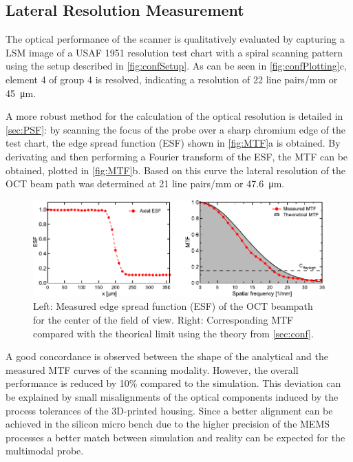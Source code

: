 \subsection{Lateral Resolution Measurement}
The optical performance of the scanner is qualitatively evaluated by capturing a LSM image of a USAF 1951 resolution test chart with a spiral scanning pattern using the setup described in \autoref{fig:confSetup}. As can be seen in \autoref{fig:confPlotting}c, element 4 of group 4 is resolved, indicating a resolution of 22 line pairs/mm or \SI{45}{\micro\meter}. 

A more robust method for the calculation of the optical resolution is detailed in \autoref{sec:PSF}: by scanning the focus of the probe over a sharp chromium edge of the test chart, the edge spread function (ESF) shown in \autoref{fig:MTF}a is obtained. By derivating and then performing a Fourier transform of the ESF, the MTF can be obtained, plotted in \autoref{fig:MTF}b. Based on this curve the lateral resolution of the OCT beam path was determined at 21 line pairs/mm or \SI{47.6}{\micro\meter}. 
\begin{figure}[h!]\centering \includegraphics{figures/50_Measurements/conf/res/confResMeas.pdf}
      \caption{Left: Measured edge spread function (ESF) of the OCT beampath for the center of the field of view. 
      Right: Corresponding MTF compared with the theorical limit using the theory from \autoref{sec:conf}.}
      \label{fig:MTF}
\end{figure}
A good concordance is observed between the shape of the analytical and the measured MTF curves of the scanning modality. However, the overall performance is reduced by 10\% compared to the simulation. This deviation can be explained by small misalignments of the optical components induced by the process tolerances of the 3D-printed housing. Since a better alignment can be achieved in the silicon micro bench due to the higher precision of the MEMS processes a better match between simulation and reality can be expected for the multimodal probe.

